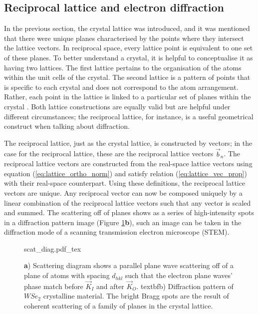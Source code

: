 \subsection{Reciprocal lattice and electron diffraction}
\label{sec:diffraction}
In the previous section, the crystal lattice was introduced, and it was mentioned that there were unique planes characterised by the points where they intersect the lattice vectors.
In reciprocal space, every lattice point is equivalent to one set of these planes.
To better understand a crystal, it is helpful to conceptualise it as having two lattices. The first lattice pertains to the organisation of the atoms within the unit cells of the crystal. The second lattice is a pattern of points that is specific to each crystal and does not correspond to the atom arrangement. Rather, each point in the lattice is linked to a particular set of planes within the crystal \cite{Williams2009-ww}.
Both lattice constructions are equally valid but are helpful under different circumstances; the reciprocal lattice, for instance, is a useful geometrical construct when talking about diffraction.

The reciprocal lattice, just as the crystal lattice, is constructed by vectors; in the case for the reciprocal lattice, these are the reciprocal lattice vectors $\vec{b}_n$.
The reciprocal lattice vectors are constructed from the real-space lattice vectors using equation (\ref{eq:lattice_ortho_norm}) and satisfy relation (\ref{eq:lattice_vec_prop}) with their real-space counterpart.
Using these definitions, the reciprocal lattice vectors are unique.
Any reciprocal vector can now be composed uniquely by a linear combination of the reciprocal lattice vectors such that any vector is scaled and summed.
The scattering off of planes shows as a series of high-intensity spots in a diffraction pattern image (Figure \ref{fig:scatt_angle}\textbf{b}), such an image can be taken in the diffraction mode of a scanning transmission electron microscope (STEM). \\



\begin{figure}[h]
    \centering
    \def\svgwidth{.9\linewidth}
    {scat_diag.pdf_tex}
    \caption{\textbf{a}) Scattering diagram shows a parallel plane wave scattering off of a plane of atoms with spacing $d_{hkl}$ such that the electron plane waves' phase match before $\vec{K}_I$ and after $\vec{K}_O$. textbf{b}) Diffraction pattern of $WSe_2$ crystalline material. The bright Bragg spots are the result of coherent scattering of a family of planes in the crystal lattice.}
    \label{fig:scatt_angle}
\end{figure}


